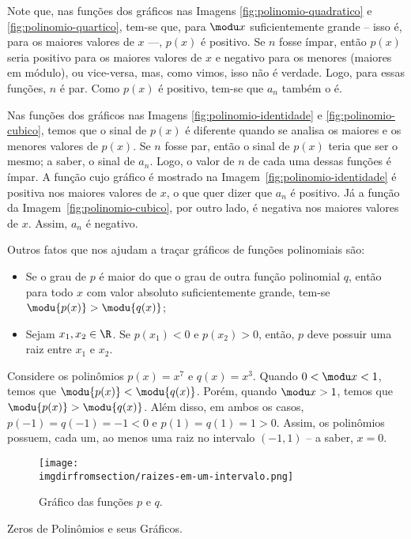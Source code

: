 \begin{solution}
  Note que, nas funções dos gráficos nas Imagens \ref{fig:polinomio-quadratico} e \ref{fig:polinomio-quartico},
  tem-se que, para $\modu x$ suficientemente grande -- isso é, para os maiores valores de $x$ ---, 
  $p(x)$ é positivo. 
  Se $n$ fosse ímpar, então $p(x)$ seria positivo para os maiores valores de $x$ e negativo para os menores (maiores
  em módulo), ou vice-versa, mas, como vimos, isso não é verdade. 
  Logo, para essas funções, $n$ é par. 
  Como $p(x)$ é positivo, tem-se que $a_n$ também o é.

  Nas funções dos gráficos nas Imagens \ref{fig:polinomio-identidade} e \ref{fig:polinomio-cubico}, temos que o 
  sinal de $p(x)$ é diferente quando se analisa os maiores e os menores valores de $p(x)$.
  Se $n$ fosse par, então o sinal de $p(x)$ teria que ser o mesmo; a saber, o sinal de $a_n$.
  Logo, o valor de $n$ de cada uma dessas funções é ímpar.  
  A função cujo gráfico é mostrado na Imagem~\ref{fig:polinomio-identidade} é positiva nos maiores valores de $x$,
  o que quer dizer que $a_n$ é positivo. 
  Já a função da Imagem~\ref{fig:polinomio-cubico}, por outro lado, é negativa nos maiores valores de $x$.
  Assim, $a_n$ é negativo.
\end{solution}


Outros fatos que nos ajudam a traçar gráficos de funções polinomiais são:
%
\begin{itemize}
\item Se o grau de $p$ é maior do que o grau de outra função polinomial $q$, 
então para todo $x$ com valor absoluto suficientemente grande, 
tem-se $\modu {p(x)} > \modu{q(x)}$;
\item Sejam $x_1, x_2 \in \R$. Se $p(x_1) < 0$ e $p(x_2)>0$,
então, $p$ deve possuir uma raiz entre $x_1$ e $x_2$.
\end{itemize}

\begin{example}
Considere os polinômios $p(x) = x^7 $ e $q(x)=x^3$. 
Quando $0< \modu x < 1$, temos que $\modu {p(x)} < \modu{q(x)}$. 
Porém, quando $ \modu x > 1$, temos que $\modu {p(x)} > \modu{q(x)}$. 
Além disso, em ambos os casos, $p(-1) = q(-1) = -1 <0$ e $p(1) = q(1) = 1 >0$.
Assim, os polinômios possuem, cada um, ao menos uma raiz no
intervalo $(-1, 1)$ -- a saber, $x=0$.
\end{example}

\begin{figure}[H]
  \centering\texttt{[image: \\imgdirfromsection/raizes-em-um-intervalo.png]}
  \caption{Gráfico das funções $p$ e $q$.}
  \label{fig:raizes-em-um-intervalo}
\end{figure}

\begin{onlineact}
    {Zeros de Polinômios e seus Gráficos}.
\end{onlineact}